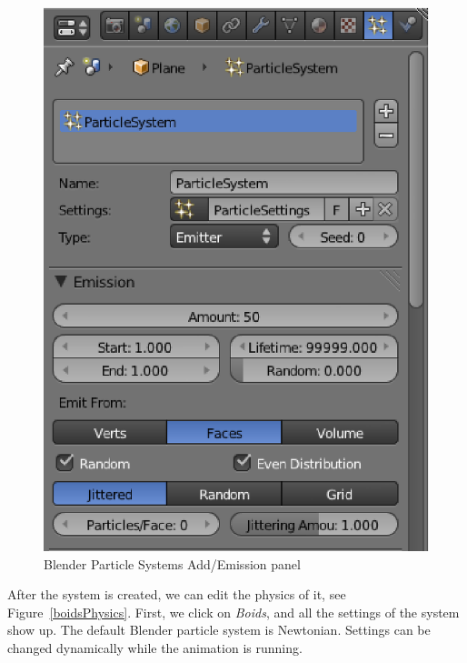 \begin{figure}[htbp]
\begin{center}
\includegraphics[scale= 0.5]{figures/boidsCreatePS.eps} 
\caption{Blender Particle Systems Add/Emission panel}
\label{boidsCreatePS}
\end{center}
\end{figure}

After the system is created, we can edit the physics of it, see Figure~\ref{boidsPhysics}. First, we click on \textit{Boids}, and all the settings of the system show up. The default Blender particle system is Newtonian. Settings can be changed dynamically while the animation is running.

